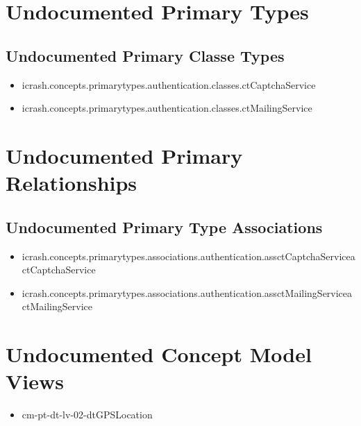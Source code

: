 \section[Undocumented Primary Types]{Undocumented Primary Types}

\subsection[Undocumented Primary Classe Types]{Undocumented Primary Classe Types}
\begin{itemize}
\item icrash.concepts.primarytypes.authentication.classes.ctCaptchaService 
\item icrash.concepts.primarytypes.authentication.classes.ctMailingService 
\end{itemize}








\section[Undocumented Primary Type Relationships]{Undocumented Primary Relationships}

\subsection[Undocumented Primary Type Associations]{Undocumented Primary Type Associations}
\begin{itemize}
\item icrash.concepts.primarytypes.associations.authentication.assctCaptchaServiceactCaptchaService 
\item icrash.concepts.primarytypes.associations.authentication.assctMailingServiceactMailingService 
\end{itemize}












\section[Undocumented Concept Model Views]{Undocumented Concept Model Views}
\begin{itemize}
\item cm-pt-dt-lv-02-dtGPSLocation 
\end{itemize}


